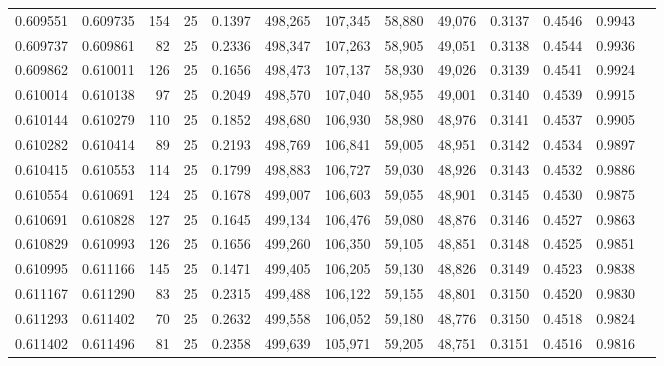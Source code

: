 \begin{tabular}{rrrrrrrrrrrrr}
0.609551 & 0.609735 &   154 &  25 &                                     0.1397 & 498,265 & 107,345 &  58,880 &  49,076 & 0.3137 & 0.4546 & 0.9943 \\
0.609737 & 0.609861 &    82 &  25 &                                     0.2336 & 498,347 & 107,263 &  58,905 &  49,051 & 0.3138 & 0.4544 & 0.9936 \\
0.609862 & 0.610011 &   126 &  25 &                                     0.1656 & 498,473 & 107,137 &  58,930 &  49,026 & 0.3139 & 0.4541 & 0.9924 \\
0.610014 & 0.610138 &    97 &  25 &                                     0.2049 & 498,570 & 107,040 &  58,955 &  49,001 & 0.3140 & 0.4539 & 0.9915 \\
0.610144 & 0.610279 &   110 &  25 &                                     0.1852 & 498,680 & 106,930 &  58,980 &  48,976 & 0.3141 & 0.4537 & 0.9905 \\
0.610282 & 0.610414 &    89 &  25 &                                     0.2193 & 498,769 & 106,841 &  59,005 &  48,951 & 0.3142 & 0.4534 & 0.9897 \\
0.610415 & 0.610553 &   114 &  25 &                                     0.1799 & 498,883 & 106,727 &  59,030 &  48,926 & 0.3143 & 0.4532 & 0.9886 \\
0.610554 & 0.610691 &   124 &  25 &                                     0.1678 & 499,007 & 106,603 &  59,055 &  48,901 & 0.3145 & 0.4530 & 0.9875 \\
0.610691 & 0.610828 &   127 &  25 &                                     0.1645 & 499,134 & 106,476 &  59,080 &  48,876 & 0.3146 & 0.4527 & 0.9863 \\
0.610829 & 0.610993 &   126 &  25 &                                     0.1656 & 499,260 & 106,350 &  59,105 &  48,851 & 0.3148 & 0.4525 & 0.9851 \\
0.610995 & 0.611166 &   145 &  25 &                                     0.1471 & 499,405 & 106,205 &  59,130 &  48,826 & 0.3149 & 0.4523 & 0.9838 \\
0.611167 & 0.611290 &    83 &  25 &                                     0.2315 & 499,488 & 106,122 &  59,155 &  48,801 & 0.3150 & 0.4520 & 0.9830 \\
0.611293 & 0.611402 &    70 &  25 &                                     0.2632 & 499,558 & 106,052 &  59,180 &  48,776 & 0.3150 & 0.4518 & 0.9824 \\
0.611402 & 0.611496 &    81 &  25 &                                     0.2358 & 499,639 & 105,971 &  59,205 &  48,751 & 0.3151 & 0.4516 & 0.9816 \\

\end{tabular}
